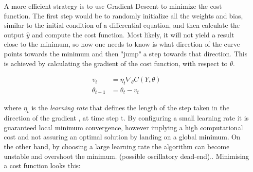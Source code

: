 A more efficient strategy is to use Gradient Descent to minimize the cost function. The first step would be to randomly initialize all the weights and bias, similar to the initial condition of a differential equation, and then calculate the output $\hat{y}$ and compute the cost function. Most likely, it will not yield a result close to the minimum, so now one needs to know is what direction of the curve points towards the minimum and then "jump" a step towards that direction. This is achieved by calculating the gradient of the cost function, with respect to $\theta$.

\begin{align}
	v_t &= \eta_t \nabla_{\theta} C(Y,\theta) \\
	\theta_{t+1} &= 	\theta_{t}  - v_t
\end{align}

where  $\eta_t$ is the \textit{learning rate} that defines the length of the step taken in the direction of the gradient , at time step t. By configuring a small learning rate it is guaranteed local minimum convergence, however implying a high computational cost and not assuring an optimal solution by landing on a global minimum. On the other hand, by choosing a large learning rate the algorithm can become unstable and overshoot the minimum. (possible oscillatory dead-end).\cite{ml_phys}.  Minimising a cost function looks this:

